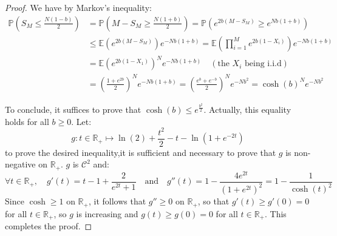 \documentclass[a4paper,10pt]{report}
\theoremstyle{definition}
\theoremstyle{plain}
\theoremstyle{definition}
\newcommand{\R}{\mathbb{R}}
\newcommand{\E}{\mathbb{E}}
\newcommand{\mC}{\mathcal{C}}
\renewcommand{\(}{\left(}
\renewcommand{\)}{\right)}
\renewcommand{\P}{\mathbb{P}}
\begin{document}
\begin{proof}
We have by Markov's inequality:
\begin{align*}
\P\(S_M\leq\frac{N(1-b)}{2}\)&=\P\(M-S_M\geq\frac{N(1+b)}{2}\)=\P\(e^{2b(M-S_M)}\geq e^{Nb(1+b)}\)\\
&\leq \E\(e^{2b(M-S_M)}\)e^{-Nb(1+b)}= \E\(\prod_{i=1}^M e^{2b(1-X_i)}\)e^{-Nb(1+b)}\\
&=\E(e^{2b(1-X_1)})^Ne^{-Nb(1+b)} \quad (\mbox{the } X_i \mbox{ being i.i.d})\\
&=\(\frac{1+e^{2b}}{2}\)^Ne^{-Nb(1+b)}=\(\frac{e^b+e^{-b}}{2}\)^Ne^{-Nb^2}=\cosh(b)^Ne^{-Nb^2}
\end{align*}

To conclude, it suffices to prove that $\cosh(b)\leq e^{\frac{b^2}{2}}$. Actually, this equality holds for all $b\geq 0$. Let: 
\[g: t\in\R_+\longmapsto \ln(2)+\frac{t^2}{2}-t-\ln\(1+e^{-2t}\)\]
to prove the desired inequality,it is sufficient and necessary to prove that $g$ is non-negative on $\R_+$. $g$ is $\mC^2$ and:
\[\forall t\in\R_+, \quad g'(t)=t-1+\frac{2}{e^{2t}+1} \quad \mbox{and} \quad g''(t)=1-\frac{4e^{2t}}{(1+e^{2t})^2}=1-\frac{1}{\cosh(t)^2}\]
Since $\cosh\geq 1 $ on $\R_+$, it follows that $g''\geq 0$ on $\R_+$, so that $g'(t)\geq g'(0)=0$ for all $t\in\R_+$, so $g$ is increasing and $g(t)\geq g(0)=0$ for all $t\in\R_+$. This completes the proof.
\end{proof}
\end{document}
